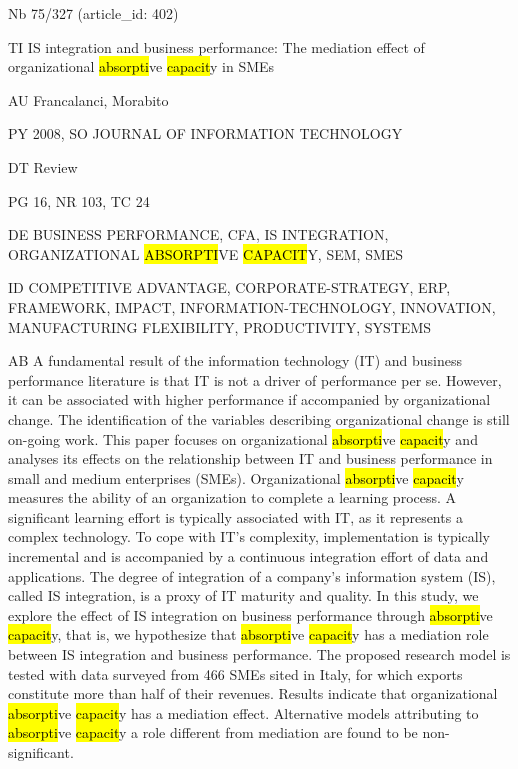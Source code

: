 \documentclass[a4paper]{article}
\begin{document}
\vspace*{-2cm}
Nb \tabto{0cm}75/327 (article\_id: 402)\par
TI \tabto{0cm}IS integration and business performance: The mediation effect of organizational \hl{absorpti}ve \hl{capacit}y in SMEs\par
AU \tabto{0cm}Francalanci, Morabito\par
PY \tabto{0cm}2008, SO JOURNAL OF INFORMATION TECHNOLOGY\par
DT \tabto{0cm}Review\par
PG \tabto{0cm}16, NR 103, TC 24\par
DE \tabto{0cm}BUSINESS PERFORMANCE, CFA, IS INTEGRATION, ORGANIZATIONAL \hl{ABSORPTI}VE \hl{CAPACIT}Y, SEM, SMES\par
ID \tabto{0cm}COMPETITIVE ADVANTAGE, CORPORATE-STRATEGY, ERP, FRAMEWORK, IMPACT, INFORMATION-TECHNOLOGY, INNOVATION, MANUFACTURING FLEXIBILITY, PRODUCTIVITY, SYSTEMS\par
AB \tabto{0cm}A fundamental result of the information technology (IT) and business performance literature is that IT is not a driver of performance per se. However, it can be associated with higher performance if accompanied by organizational change. The identification of the variables describing organizational change is still on-going work. This paper focuses on organizational \hl{absorpti}ve \hl{capacit}y and analyses its effects on the relationship between IT and business performance in small and medium enterprises (SMEs). Organizational \hl{absorpti}ve \hl{capacit}y measures the ability of an organization to complete a learning process. A significant learning effort is typically associated with IT, as it represents a complex technology. To cope with IT's complexity, implementation is typically incremental and is accompanied by a continuous integration effort of data and applications. The degree of integration of a company's information system (IS), called IS integration, is a proxy of IT maturity and quality. In this study, we explore the effect of IS integration on business performance through \hl{absorpti}ve \hl{capacit}y, that is, we hypothesize that \hl{absorpti}ve \hl{capacit}y has a mediation role between IS integration and business performance. The proposed research model is tested with data surveyed from 466 SMEs sited in Italy, for which exports constitute more than half of their revenues. Results indicate that organizational \hl{absorpti}ve \hl{capacit}y has a mediation effect. Alternative models attributing to \hl{absorpti}ve \hl{capacit}y a role different from mediation are found to be non-significant.\par
\clearpage
\end{document}
